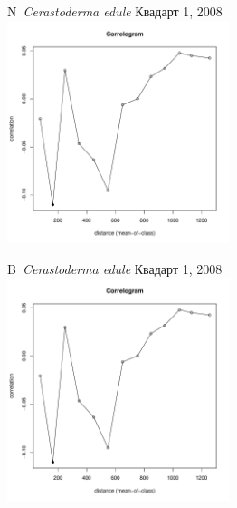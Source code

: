 \documentclass[12pt, a4paper]{disser}
\begin{document}
\begin{figure}[h]
	
	\begin{minipage}[b]{.46\linewidth}
	\begin{center}
	{\small N~{\it Cerastoderma edule} Квадарт 1, 2008}
		\includegraphics[width=65mm]{../Barenc_Sea/distribution_Moran/Plyazh081_moran_B_Cerastoderma_edule_.pdf}

	\end{center}
	\end{minipage}
	\hfil %
	\begin{minipage}[b]{.46\linewidth}
	\begin{center}
	{\small B~{\it Cerastoderma edule} Квадарт 1, 2008}
		\includegraphics[width=65mm]{../Barenc_Sea/distribution_Moran/Plyazh081_moran_B_Cerastoderma_edule_.pdf}
	\end{center}
	\end{minipage}


\end{figure}
\end{document}
